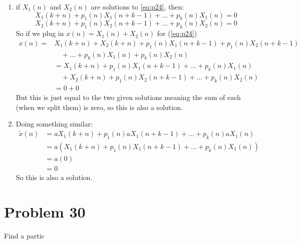 \documentclass[12pt,letterpaper]{article}
\theoremstyle{definition}
\begin{document}
\begin{changemargin}{.5cm}{0cm}
    \begin{enumerate}
        \item    
   if $X_1(n)$ and $X_2(n)$ are solutions to \ref{eq:p24}, then:
   \begin{equation*}
    X_1(k+n) + p_1(n) X_1(n+k-1)+\dots +p_k(n)X_1(n)=0
   \end{equation*}
   \begin{equation*}
    X_2(k+n) + p_1(n) X_2(n+k-1)+\dots +p_k(n)X_2(n)=0
   \end{equation*}
   So if we plug in $x(n) = X_1(n) + X_2(n)$ for (\ref{eq:p24})
   \begin{align*}
    x(n)=&X_1(k+n)+X_2(k+n) + p_1(n) X_1(n+k-1)+p_1(n)X_2(n+k-1)\\
    &\quad+\dots +p_k(n)X_1(n)+p_k(n)X_2(n)\\
    &=X_1(k+n) + p_1(n) X_1(n+k-1)+\dots +p_k(n)X_1(n) \\
    &\quad+X_2(k+n) + p_1(n) X_2(n+k-1)+\dots +p_k(n)X_2(n)\\
    &=0 +0
   \end{align*}
    But this is just equal to the two given solutions meaning the sum of each (when we split them) is zero, so this is also a solution.
    \item  Doing something similar:
    \begin{align*}
        \tilde{x}(n) &= aX_1(k+n) + p_1(n) aX_1(n+k-1)+\dots +p_k(n)aX_1(n)\\
        &=a(X_1(k+n) + p_1(n) X_1(n+k-1)+\dots +p_k(n)X_1(n))\\
        &=a(0)\\
        &=0
    \end{align*}
    So this is also a solution.
\end{enumerate}
\end{changemargin}

\newpage

\section*{Problem 30}

Find a partic
\end{document}
